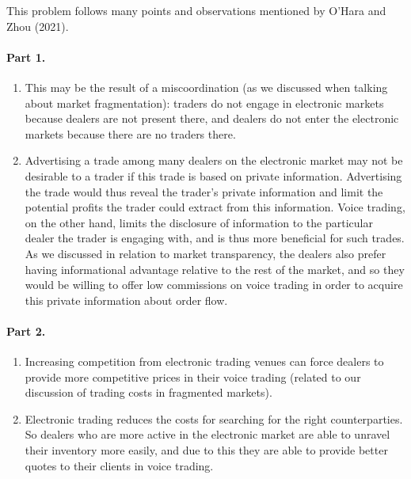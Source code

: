 \begin{solution}
	This problem follows many points and observations mentioned by O'Hara and Zhou (2021).\footnotemark
	
	\paragraph{Part 1.}
	\begin{enumerate}[label=(\alph{enumi})]
		\item This may be the result of a miscoordination (as we discussed when talking about market fragmentation): traders do not engage in electronic markets because dealers are not present there, and dealers do not enter the electronic markets because there are no traders there.
		
		\item Advertising a trade among many dealers on the electronic market may not be desirable to a trader if this trade is based on private information. Advertising the trade would thus reveal the trader's private information and limit the potential profits the trader could extract from this information. Voice trading, on the other hand, limits the disclosure of information to the particular dealer the trader is engaging with, and is thus more beneficial for such trades. As we discussed in relation to market transparency, the dealers also prefer having informational advantage relative to the rest of the market, and so they would be willing to offer low commissions on voice trading in order to acquire this private information about order flow.
	\end{enumerate}
	
	\paragraph{Part 2.}
	\begin{enumerate}[label=(\alph{enumi})]
		\item Increasing competition from electronic trading venues can force dealers to provide more competitive prices in their voice trading (related to our discussion of trading costs in fragmented markets).
		
		\item Electronic trading reduces the costs for searching for the right counterparties. So dealers who are more active in the electronic market are able to unravel their inventory more easily, and due to this they are able to provide better quotes to their clients in voice trading.
		

\end{enumerate}
\end{solution}
